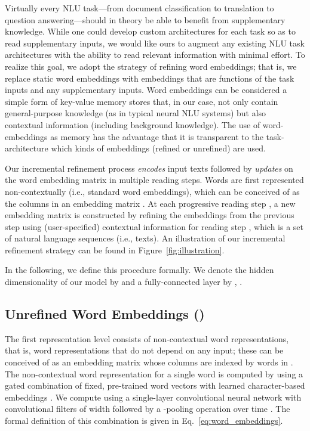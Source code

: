 \documentclass[11pt,a4paper]{article}
\begin{document}
Virtually every NLU task---from document classification to translation to question answering---should in theory be able to benefit from supplementary knowledge. While one could develop custom architectures for each task so as to read supplementary inputs, we would like ours to augment any existing NLU task architectures with the ability to read relevant information with minimal effort. To realize this goal, we adopt the strategy of refining word embeddings; that is, we replace static word embeddings with embeddings that are functions of the task inputs and any supplementary inputs.
Word embeddings can be considered a simple form of key-value memory stores that, in our case, not only contain general-purpose knowledge (as in typical neural NLU systems) but also contextual information (including background knowledge). The use of word-embeddings as memory has the advantage that it is transparent to the task-architecture which kinds of embeddings (refined or unrefined) are used.

Our incremental refinement process \textit{encodes} input texts followed by \textit{updates} on the word embedding matrix in multiple reading steps. Words are first represented non-contextually (i.e., standard word embeddings), which can be conceived of as the columns in an embedding matrix . At each progressive reading step , a new embedding matrix  is constructed by refining the embeddings from the previous step  using (user-specified) contextual information  for reading step , which is a set of natural language sequences (i.e., texts). 
An illustration of our incremental refinement strategy can be found in Figure~\ref{fig:illustration}.

In the following, we define this procedure formally. We denote the hidden dimensionality of our model by  and a fully-connected layer by , .

\subsection{Unrefined Word Embeddings ()}\label{sec:noncontextual_embeddings}
The first representation level consists of non-contextual word representations, that is, word representations that do not depend on any input; these can be conceived of as an embedding matrix  whose columns are indexed by words in . The non-contextual word representation  for a single word  is computed by using a gated combination of fixed, pre-trained word vectors  with learned character-based embeddings . We compute  using a single-layer convolutional neural network with  convolutional filters of width  followed by a -pooling operation over time \citep{Seo2017,Weissenborn2017}. The formal definition of this combination is given in Eq.~\ref{eq:word_embeddings}.
\end{document}
